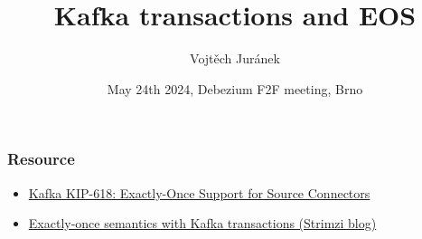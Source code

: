 \documentclass[10pt,utf8]{beamer}
\title{Kafka transactions and EOS}
\author{Vojtěch Juránek}
\institute[Red Hat]{Red Hat}
\date{May 24th 2024, Debezium F2F meeting, Brno}
\begin{document}


\begin{frame}
    \titlepage
\end{frame}

\begin{frame}
    \frametitle{Resource}
    \begin{itemize}
        \color{blue}
        \item \href{https://cwiki.apache.org/confluence/display/KAFKA/KIP-618\%3A+Exactly-Once+Support+for+Source+Connectors}{Kafka KIP-618: Exactly-Once Support for Source Connectors}
        \item \href{https://strimzi.io/blog/2023/05/03/kafka-transactions/}{Exactly-once semantics with Kafka transactions (Strimzi blog)}
        \color{black}
    \end{itemize}
\end{frame}



\end{document}
